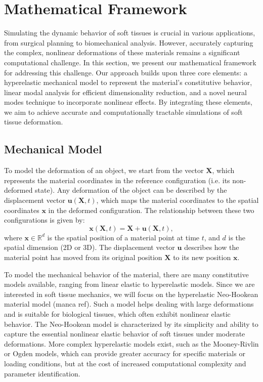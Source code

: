 \section{Mathematical Framework}
\label{sec:problem_setting}

Simulating the dynamic behavior of soft tissues is crucial in various applications, from surgical planning to biomechanical analysis. However, accurately capturing the complex, nonlinear deformations of these materials remains a significant computational challenge. In this section, we present our mathematical framework for addressing this challenge. Our approach builds upon three core elements: a hyperelastic mechanical model to represent the material's constitutive behavior, linear modal analysis for efficient dimensionality reduction, and a novel neural modes technique to incorporate nonlinear effects. By integrating these elements, we aim to achieve accurate and computationally tractable simulations of soft tissue deformation.


\subsection{Mechanical Model}
\label{sec:mechanical_model}

To model the deformation of an object, we start from the vector \(\bm{X}\), which represents the material coordinates in the reference configuration (i.e. its non-deformed state). Any deformation of the object can be described by the displacement vector \(\bm{u}(\bm{X},t)\), which maps the material coordinates to the spatial coordinates \(\bm{x}\) in the deformed configuration. The relationship between these two configurations is given by:
\begin{equation}
    \bm{x}(\bm{X},t) = \bm{X} + \bm{u}(\bm{X},t),
\label{eq:deformation}
\end{equation}
where \(\bm{x} \in \mathbb{R}^d\) is the spatial position of a material point at time \(t\), and \(d\) is the spatial dimension (2D or 3D). The displacement vector \(\bm{u}\) describes how the material point has moved from its original position \(\bm{X}\) to its new position \(\bm{x}\).

To model the mechanical behavior of the material, there are many constitutive models available, ranging from linear elastic to hyperelastic models. Since we are interested in soft tissue mechanics, we will focus on the hyperelastic Neo-Hookean material model (manca ref). Such a model helps dealing with large deformations and is suitable for biological tissues, which often exhibit nonlinear elastic behavior. The Neo-Hookean model is characterized by its simplicity and ability to capture the essential nonlinear elastic behavior of soft tissues under moderate deformations. More complex hyperelastic models exist, such as the Mooney-Rivlin or Ogden models, which can provide greater accuracy for specific materials or loading conditions, but at the cost of increased computational complexity and parameter identification.

